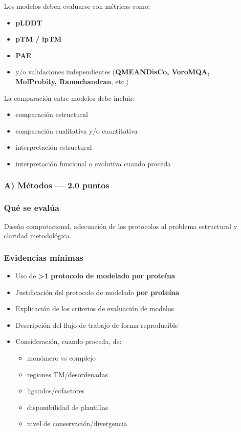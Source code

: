 \documentclass[
  11pt,
  a4paper,
  twoside]{scrreprt}
\providecommand{\tightlist}{%
  \setlength{\itemsep}{0pt}\setlength{\parskip}{0pt}}
\begin{document}
Los modelos deben evaluarse con métricas como:

\begin{itemize}
\item
  \textbf{pLDDT}
\item
  \textbf{pTM / ipTM}
\item
  \textbf{PAE}
\item
  y/o validaciones independientes (\textbf{QMEANDisCo, VoroMQA,
  MolProbity, Ramachandran}, etc.)
\end{itemize}

La comparación entre modelos debe incluir:

\begin{itemize}
\item
  comparación estructural
\item
  comparación cualitativa y/o cuantitativa
\item
  interpretación estructural
\item
  interpretación funcional o evolutiva cuando proceda
\end{itemize}

\subsubsection{A) Métodos --- 2.0 puntos}\label{a-muxe9todos-2.0-puntos}

\subsubsection{Qué se evalúa}\label{quuxe9-se-evaluxfaa}

Diseño computacional, adecuación de los protocolos al problema
estructural y claridad metodológica.

\subsubsection{Evidencias mínimas}\label{evidencias-muxednimas}

\begin{itemize}
\item
  Uso de \textbf{\textgreater1 protocolo de modelado por proteína}
\item
  Justificación del protocolo de modelado \textbf{por proteína}
\item
  Explicación de los criterios de evaluación de modelos
\item
  Descripción del flujo de trabajo de forma reproducible
\item
  Consideración, cuando proceda, de:

  \begin{itemize}
  \tightlist
  \item
    monómero vs complejo
  \item
    regiones TM/desordenadas
  \item
    ligandos/cofactores
  \item
    disponibilidad de plantillas
  \item
    nivel de conservación/divergencia
  \end{itemize}
\end{itemize}
\end{document}
